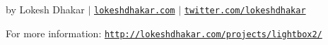 by Lokesh Dhakar $\vert$ \href{http://www.lokeshdhakar.com}{\tt lokeshdhakar.\+com} $\vert$ \href{http://twitter.com/lokeshdhakar}{\tt twitter.\+com/lokeshdhakar}

For more information\+: \href{http://lokeshdhakar.com/projects/lightbox2/}{\tt http\+://lokeshdhakar.\+com/projects/lightbox2/} 